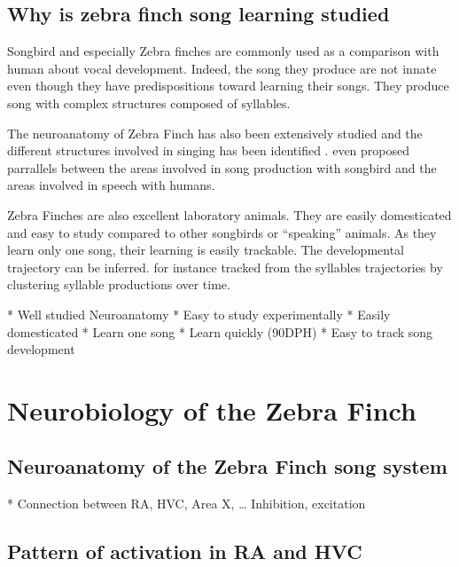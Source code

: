 \documentclass{report}
\begin{document}
\subsection{Why is zebra finch song learning
studied}\label{why-is-zebra-finch-song-learning-studied}

Songbird and especially Zebra finches are commonly used as a comparison with
human about vocal development. Indeed, the song they produce are not innate even
though they have predispositions toward learning their songs. They produce
song with complex structures composed of syllables.

The neuroanatomy of Zebra Finch has also been extensively studied and the
different structures involved in singing has been identified
\parencite{nottebohm_neural_2005, bertram_two_2014}.
\textcite{doupe_birdsong_1999} even proposed parrallels between the areas
involved in song production with songbird and the areas involved in speech with
humans.

Zebra Finches are also excellent laboratory animals. They are easily
domesticated and easy to study compared to other songbirds or ``speaking''
animals. As they learn only one song, their
learning is easily trackable. The developmental trajectory can be inferred.
\textcite{deregnaucourt_how_2005} for instance tracked from the syllables
trajectories by clustering syllable productions over time.

  * Well studied Neuroanatomy
  * Easy to study experimentally
        * Easily domesticated
      * Learn one song
      * Learn quickly (90DPH)
      * Easy to track song development

\section{Neurobiology of the Zebra Finch}
\label{neurobiology-of-the-zebra-finch}

\subsection{Neuroanatomy of the Zebra Finch song system}
\label{neuroanatomy-of-the-zebra-finch-song-system}

  * Connection between RA, HVC, Area X, \ldots{} Inhibition, excitation

\subsection{Pattern of activation in RA and HVC}
\label{pattern-of-activation-in-ra-and-hvc}
\end{document}
